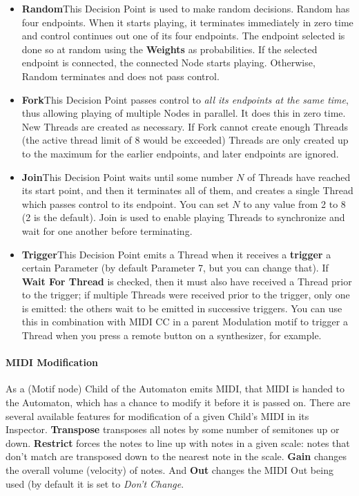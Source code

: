 \documentclass[twoside,10pt]{article}
\begin{document}
\begin{itemize}
\item{\bf Random}\quad This Decision Point is used to make random decisions.  Random has four endpoints.  When it starts playing, it terminates immediately in zero time and control continues out one of its four endpoints. The endpoint selected is done so at random using the {\bf Weights} as probabilities.  If the selected endpoint is connected, the connected Node starts playing.  Otherwise, Random terminates and does not pass control. 

\item{\bf Fork}\quad This Decision Point passes control to {\it all its endpoints at the same time}, thus allowing playing of multiple Nodes in parallel.  It does this in zero time.  New Threads are created as necessary.  If Fork cannot create enough Threads (the active thread limit of 8 would be exceeded) Threads are only created up to the maximum for the earlier endpoints, and later endpoints are ignored.

\item{\bf Join}\quad This Decision Point waits until some number \(N\) of Threads have reached its start point, and then it terminates all of them, and creates a single Thread which passes control to its endpoint.  You can set \(N\) to any value from 2 to 8 (2 is the default).  Join is used to enable playing Threads to synchronize and wait for one another before terminating.  

\item{\bf Trigger}\quad This Decision Point emits a Thread when it receives a {\bf trigger} a certain Parameter (by default Parameter 7, but you can change that).  If {\bf Wait For Thread} is checked, then it must also have received a Thread prior to the trigger; if multiple Threads were received prior to the trigger, only one is emitted: the others wait to be emitted in successive triggers.  You can use this in combination with MIDI CC in a parent Modulation motif to trigger a Thread when you press a remote button on a synthesizer, for example.

\end{itemize}

\paragraph{MIDI Modification}

As a (Motif node) Child of the Automaton emits MIDI, that MIDI is handed to the Automaton, which has a chance to modify it before it is passed on.  There are several available features for modification of a given Child's MIDI in its Inspector.  {\bf Transpose} transposes all notes by some number of semitones up or down.  {\bf Restrict} forces the notes to line up with notes in a given scale: notes that don't match are transposed down to the nearest note in the scale.  {\bf Gain} changes the overall volume (velocity) of notes.  And {\bf Out} changes the MIDI Out being used (by default it is set to {\it Don't Change}.
\end{document}
